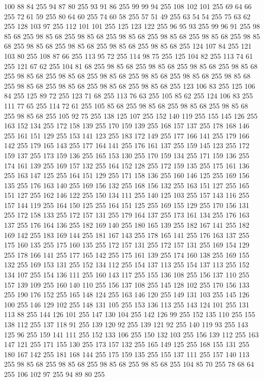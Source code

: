 100 88 84 255 94 87 80 255 93 91 86 255 99 99 94 255 108 102 101 255 69 64 66 255 72 61 59 255 80 64 60 255 74 60 58 255 57 51 49 255 63 54 54 255 75 63 62 255 128 103 97 255 112 101 101 255 125 123 122 255 96 95 93 255 99 96 91 255 98 85 68 255 98 85 68 255 98 85 68 255 98 85 68 255 98 85 68 255 98 85 68 255 98 85 68 255 98 85 68 255 98 85 68 255 98 85 68 255 98 85 68 255 124 107 84 255 121 103 80 255 108 87 66 255 113 95 72 255 114 98 75 255 125 104 82 255 113 74 61 255 121 67 62 255 104 81 68 255 98 85 68 255 98 85 68 255 98 85 68 255 98 85 68 255 98 85 68 255 98 85 68 255 98 85 68 255 98 85 68 255 98 85 68 255 98 85 68 255 98 85 68 255 98 85 68 255 98 85 68 255 98 85 68 255 123 106 83 255 125 106 84 255 125 89 72 255 123 71 68 255 113 76 63 255 105 85 62 255 124 106 83 255 111 77 65 255 114 72 61 255 105 85 68 255 98 85 68 255 98 85 68 255 98 85 68 255
98 85 68 255 105 92 75 255 138 125 107 255 152 140 119 255 155 145 126 255 163 152 134 255 172 158 139 255 170 159 139 255 168 157 137 255 178 168 146 255 161 151 129 255 153 141 123 255 183 172 149 255 177 166 141 255 179 166 142 255 179 165 143 255 177 164 141 255 176 161 137 255 159 145 123 255 172 159 137 255 173 159 136 255 165 153 130 255 170 159 134 255 171 159 136 255 174 161 139 255 169 157 132 255 164 152 128 255 172 159 135 255 175 161 136 255 163 147 125 255 164 151 129 255 171 158 136 255 160 146 125 255 169 156 135 255 176 163 140 255 169 156 132 255 168 156 132 255 163 151 127 255 165 151 127 255 162 146 122 255 150 134 111 255 140 125 103 255 157 143 116 255 157 144 119 255 164 150 125 255 164 151 125 255 169 155 129 255 170 156 131 255 172 158 133 255 172 157 131 255 179 164 137 255 173 161 134 255 176 163 137 255 176 164 136 255 182 169 140 255 180 165 139 255 182 167 141 255 182 169 142 255 183 169 144 255 181 167 143 255 178 165 141 255 176 163 137 255 175 160 135 255 175 160 135 255
172 157 131 255 172 157 131 255 169 154 129 255 178 166 141 255 177 165 142 255 175 161 139 255 174 160 138 255 169 155 132 255 169 153 131 255 152 134 112 255 154 137 113 255 154 137 113 255 152 134 107 255 154 136 111 255 160 143 117 255 155 136 108 255 156 137 110 255 157 139 109 255 160 140 110 255 156 137 108 255 145 128 102 255 170 156 133 255 190 176 152 255 165 148 124 255 163 146 120 255 149 131 103 255 145 126 100 255 146 129 102 255 148 131 105 255 153 136 113 255 143 124 101 255 131 113 88 255 144 126 101 255 147 130 104 255 142 126 99 255 152 135 110 255 155 138 112 255 137 118 91 255 139 120 92 255 139 121 92 255 140 119 93 255 143 125 96 255 159 141 111 255 152 133 106 255 150 132 103 255 156 139 112 255 163 147 121 255 171 155 130 255 173 157 132 255 165 149 125 255 168 155 131 255 180 167 142 255 181 168 144 255 175 159 135 255 155 137 111 255 157 140 113 255 98 85 68 255 98 85 68 255 98 85 68 255 98 85 68 255 104 85 70 255 78 68 64 255 106 102 97 255 94 89 80 255
